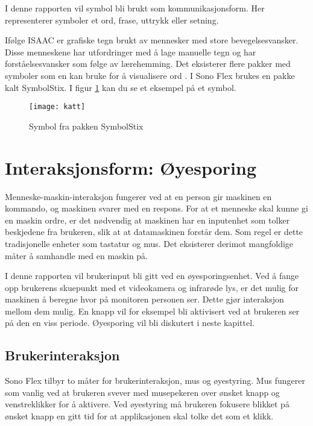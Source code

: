 I denne rapporten vil symbol bli brukt som kommunikasjonsform. Her representerer symboler et ord, frase, uttrykk eller setning. 

Ifølge ISAAC \cite{Tegnsystemer} er grafiske tegn brukt av mennesker med store bevegelsesvansker.
Disse menneskene har utfordringer med å lage manuelle tegn og har forståelsesvansker som følge av lærehemming. Det eksisterer flere pakker med symboler som en kan bruke for å visualisere ord \cite{GrafiskTegn}. I Sono Flex brukes en pakke kalt SymbolStix. I figur \ref{fig:katt} kan du se et eksempel på et symbol. 





\begin{figure}[ht!]
\centering
\texttt{[image: katt]}
\caption{Symbol fra pakken SymbolStix}
\label{fig:katt}
\end{figure}

\section{Interaksjonsform: Øyesporing}

Menneske-maskin-interaksjon fungerer ved at en person gir maskinen en kommando, og maskinen svarer med en respons. For at et menneske skal kunne gi en maskin ordre, er det nødvendig at maskinen har en inputenhet som tolker beskjedene fra brukeren, slik at at datamaskinen forstår dem.  Som regel er dette tradisjonelle enheter som tastatur og mus. Det eksisterer derimot mangfoldige måter å samhandle med en maskin på.

I denne rapporten vil brukerinput bli gitt ved en øyesporingsenhet. Ved å fange opp brukerens skuepunkt med et videokamera og infrarøde lys, er det mulig for maskinen å beregne hvor på monitoren personen ser. Dette gjør interaksjon mellom dem mulig. En knapp vil for eksempel bli aktivisert ved at brukeren ser på den en viss periode. Øyesporing vil bli diskutert i neste kapittel.

\subsection{Brukerinteraksjon}

Sono Flex tilbyr to måter for brukerinteraksjon, mus og øyestyring. Mus fungerer som vanlig ved at brukeren svever med musepekeren over ønsket knapp og venstreklikker for å aktivere. Ved øyestyring må brukeren fokusere blikket på ønsket knapp en gitt tid for at applikasjonen skal tolke det som et klikk. 

